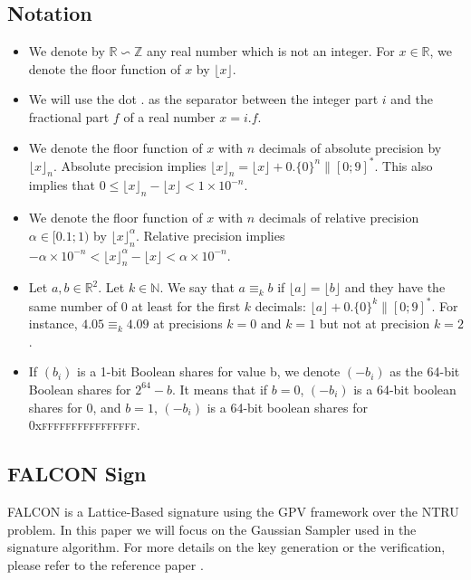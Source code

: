 \documentclass[runningheads]{llncs}
\begin{document}
\subsection{Notation}
\begin{itemize}
  \item We denote by $\mathbb{R}\backsim \mathbb{Z}$ any real number which is not an integer. For $x\in\mathbb{R}$, we denote the floor function of $x$ by $\lfloor x \rfloor$.
  \item We will use the dot $.$ as the separator between the integer part $i$ and the fractional part $f$ of a real number $x=i.f$.
  \item We denote the floor function of $x$ with $n$ decimals of absolute precision by $\lfloor x \rfloor_n$. Absolute precision implies $\lfloor x\rfloor_n = \lfloor x \rfloor + 0.\{0\}^n\|[0;9]^*$. This also implies that $0 \leq \lfloor x \rfloor_n - \lfloor x \rfloor < 1\times 10^{-n}$.
  \item We denote the floor function of $x$ with $n$ decimals of relative precision $\alpha\in[\num{0.1};1)$ by $\lfloor x \rfloor_n^\alpha$. Relative precision implies $-\alpha\times 10^{-n} < \lfloor x \rfloor_n^\alpha - \lfloor x \rfloor < \alpha\times 10^{-n}$.
  \item Let $a,b\in\mathbb{R}^2$. Let $k\in\mathbb{N}$. We say that $a\equiv_k b$ if $\lfloor a\rfloor = \lfloor b \rfloor$ and they have the same number of $0$ at least for the first $k$ decimals: $\lfloor a \rfloor + 0.\{0\}^k\|[0;9]^*$. For instance, $\num{4.05} \equiv_k \num{4.09}$ at precisions $k=0$ and $k=1$ but not at precision $k=2$.
  \item If $(b_i)$ is a 1-bit Boolean shares for value b, we denote $(-b_i)$ as the 64-bit Boolean shares for $2^{64} - b$. It means that if $b=0$, $(-b_i)$ is a 64-bit boolean shares for $0$, and
  $b=1$, $(-b_i)$ is a 64-bit boolean shares for 0x\textsc{ffffffffffffffff}. 

  
\end{itemize}
% 
\subsection{FALCON Sign}
FALCON \cite{prest2020falcon} is a Lattice-Based signature using the GPV framework over the NTRU problem. In this paper we will focus on the Gaussian Sampler used in the signature algorithm. For more details on the key generation or the verification, please refer to the reference paper \cite{prest2020falcon}.
\end{document}
